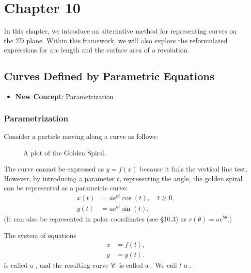 \section{Chapter 10}
In this chapter, we introduce an alternative method for representing curves on the 2D plane. Within this framework, we will also explore the reformulated expressions for arc length and the surface area of a revolution. 

\subsection{Curves Defined by Parametric Equations}  
\begin{center}
\begin{tcolorbox}
    \begin{itemize}
        \item \textbf{New Concept}: Parametrization 
    \end{itemize}
\end{tcolorbox}
\end{center}

\subsubsection{Parametrization}
Consider a particle moving along a curve as follows:
\begin{figure}[ht]
    \centering
    \resizebox{0.5\textwidth}{!}{} %
    \caption{A plot of the Golden Spiral.}
    \label{fig:golden-spiral}
\end{figure}
The curve cannot be expressed as $y = f(x)$ because it fails the vertical line test. However, by introducing a parameter $t$, representing the angle, the golden spiral can be represented as a parametric curve:
\[
\begin{aligned}
    x(t) &= a e^{b t} \cos(t), \quad t \geq 0, \\
    y(t) &= a e^{b t} \sin(t).
\end{aligned}
\]
(It can also be represented in polar coordinates (see \S10.3) as $r(\theta) = a e^{b \theta}$.)

\begin{defn}
    The system of equations 
    \begin{align*}
        x &= f(t), \\
        y &= g(t).
    \end{align*}
    is called a , and the resulting curve $\mathscr{C}$ is called a . We call $t$ a .  
\end{defn}





